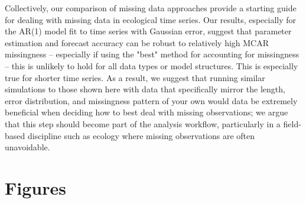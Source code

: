 \documentclass{article}
\begin{document}
Collectively, our comparison of missing data approaches provide a starting guide for dealing with missing data in ecological time series. Our results, especially for the AR(1) model fit to time series with Gaussian error, suggest that parameter estimation and forecast accuracy can be robust to relatively high MCAR missingness -- especially if using the "best" method for accounting for missingness -- this is unlikely to hold for all data types or model structures. This is especially true for shorter time series. As a result, we suggest that running similar simulations to those shown here with data that specifically mirror the length, error distribution, and missingness pattern of your own would data be extremely beneficial when deciding how to best deal with missing observations; we argue that this step should become part of the analysis workflow, particularly in a field-based discipline such as ecology where missing observations are often unavoidable. %




\newpage


\section*{Figures}

\end{document}
